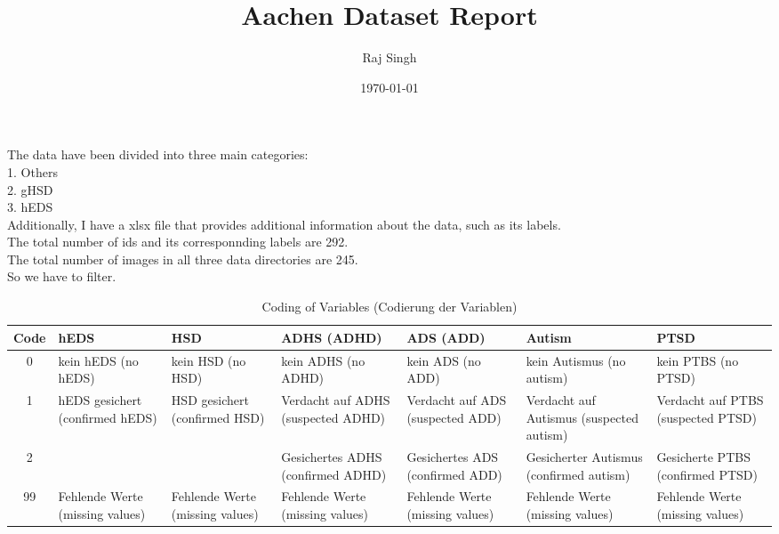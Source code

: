 \documentclass[11pt,a2paper]{article}
\title{Aachen Dataset Report}
\author{Raj Singh}
\date{\today}
\begin{document}
	
	\maketitle
	
	The data have been divided into three main categories:\\
	
	
	1. Others\\
	
	2. gHSD\\
	
	3. hEDS\\
	
	Additionally, I have a xlsx file that provides additional information about the data, such as its labels.\\
	
	
	The total number of ids and its corresponnding labels are 292.\\
	
	
	The total number of images in all three data directories are 245.\\
	
	
	So we have to filter.\\
	
	
	\begin{table}[H]
		\centering
		\caption{Coding of Variables (Codierung der Variablen)}
		\begin{tabular}{c|l|l|l|l|l|l}
			\toprule
			\textbf{Code} & \textbf{hEDS} & \textbf{HSD} & \textbf{ADHS (ADHD)} & \textbf{ADS (ADD)} & \textbf{Autism} & \textbf{PTSD} \\
			\midrule
			0  & kein hEDS (no hEDS) 
			& kein HSD (no HSD) 
			& kein ADHS (no ADHD) 
			& kein ADS (no ADD) 
			& kein Autismus (no autism) 
			& kein PTBS (no PTSD) \\
			
			1  & hEDS gesichert (confirmed hEDS) 
			& HSD gesichert (confirmed HSD) 
			& Verdacht auf ADHS (suspected ADHD) 
			& Verdacht auf ADS (suspected ADD) 
			& Verdacht auf Autismus (suspected autism) 
			& Verdacht auf PTBS (suspected PTSD) \\
			
			2  &  &  
			& Gesichertes ADHS (confirmed ADHD) 
			& Gesichertes ADS (confirmed ADD) 
			& Gesicherter Autismus (confirmed autism) 
			& Gesicherte PTBS (confirmed PTSD) \\
			
			99 & Fehlende Werte (missing values) 
			& Fehlende Werte (missing values) 
			& Fehlende Werte (missing values) 
			& Fehlende Werte (missing values) 
			& Fehlende Werte (missing values) 
			& Fehlende Werte (missing values) \\
			\bottomrule
		\end{tabular}
	\end{table}
	
	
	
	
	
	
	
	
	
	
	
	
	
	
	
\end{document}
